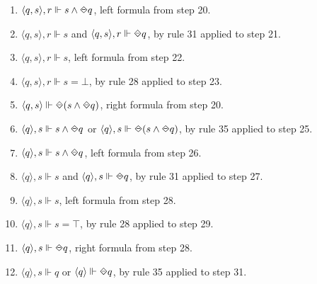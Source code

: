 \begin{myEx}
\begin{enumerate}
\item $\langle q,s \rangle, r \Vdash s \land \LTLonce q$, left formula from step 20.\\ %

\item $\langle q,s \rangle, r \Vdash s$ and $\langle q,s \rangle, r \Vdash \LTLonce q$, by rule 31 applied to step 21.\\ %

\item $\langle q,s \rangle, r \Vdash s$, left formula from step 22.\\ %

\item $\langle q,s \rangle, r \Vdash s = \bot$, by rule 28 applied to step 23.\\ %

\item $\langle q,s \rangle \Vdash \LTLonce(s \land \LTLonce q)$, right formula from step 20.\\ %

\item $\langle q \rangle, s \Vdash s \land \LTLonce q$ or $\langle q \rangle, s \Vdash \LTLonce(s \land \LTLonce q)$, by rule 35 applied to step 25.\\ %

\item $\langle q \rangle, s \Vdash s \land \LTLonce q$, left formula from step 26.\\ %

\item $\langle q \rangle, s \Vdash s$ and $\langle q \rangle, s \Vdash \LTLonce q$, by rule 31 applied to step 27.\\ %

\item $\langle q \rangle, s \Vdash s$, left formula from step 28.\\ %

\item $\langle q \rangle, s \Vdash s = \top$, by rule 28 applied to step 29.\\ %

\item $\langle q \rangle, s \Vdash \LTLonce q$, right formula from step 28.\\ %

\item $\langle q \rangle, s \Vdash q$ or $\langle q \rangle \Vdash \LTLonce q$, by rule 35 applied to step 31.\\ %


\end{enumerate}
\end{myEx}
